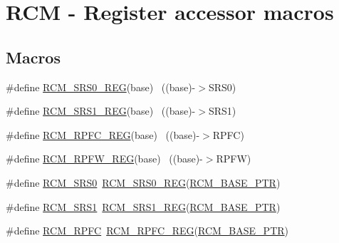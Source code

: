 \hypertarget{group___r_c_m___register___accessor___macros}{}\section{R\+CM -\/ Register accessor macros}
\label{group___r_c_m___register___accessor___macros}
\subsection*{Macros}
\begin{DoxyCompactItemize}
\item 
\#define \hyperlink{group___r_c_m___register___accessor___macros_ga9a66988adfb5c993ce955b8ca7ddaa27}{R\+C\+M\+\_\+\+S\+R\+S0\+\_\+\+R\+EG}(base)                                          ~((base)-\/$>$S\+R\+S0)
\item 
\#define \hyperlink{group___r_c_m___register___accessor___macros_gac6b0aff57a904ff809da2670a9b1992a}{R\+C\+M\+\_\+\+S\+R\+S1\+\_\+\+R\+EG}(base)                                          ~((base)-\/$>$S\+R\+S1)
\item 
\#define \hyperlink{group___r_c_m___register___accessor___macros_gaa5beb3c127ae8e82881dbd558ddf4ffb}{R\+C\+M\+\_\+\+R\+P\+F\+C\+\_\+\+R\+EG}(base)                                          ~((base)-\/$>$R\+P\+FC)
\item 
\#define \hyperlink{group___r_c_m___register___accessor___macros_ga5dd502e0c3bac4f307fbb65d51bcf2c7}{R\+C\+M\+\_\+\+R\+P\+F\+W\+\_\+\+R\+EG}(base)                                          ~((base)-\/$>$R\+P\+FW)
\item 
\#define \hyperlink{group___r_c_m___register___accessor___macros_gaae0200bfd0eb1d7f7fd0d142c21fe92a}{R\+C\+M\+\_\+\+S\+R\+S0}~\hyperlink{group___r_c_m___register___accessor___macros_ga9a66988adfb5c993ce955b8ca7ddaa27}{R\+C\+M\+\_\+\+S\+R\+S0\+\_\+\+R\+EG}(\hyperlink{group___r_c_m___peripheral_ga25ab3aa8d593d455ed36a52c77f88234}{R\+C\+M\+\_\+\+B\+A\+S\+E\+\_\+\+P\+TR})
\item 
\#define \hyperlink{group___r_c_m___register___accessor___macros_gaa2e190bc843511a82e9ec826029fbaaa}{R\+C\+M\+\_\+\+S\+R\+S1}~\hyperlink{group___r_c_m___register___accessor___macros_gac6b0aff57a904ff809da2670a9b1992a}{R\+C\+M\+\_\+\+S\+R\+S1\+\_\+\+R\+EG}(\hyperlink{group___r_c_m___peripheral_ga25ab3aa8d593d455ed36a52c77f88234}{R\+C\+M\+\_\+\+B\+A\+S\+E\+\_\+\+P\+TR})
\item 
\#define \hyperlink{group___r_c_m___register___accessor___macros_ga1c19f66051e218d534efc33ec09cc461}{R\+C\+M\+\_\+\+R\+P\+FC}~\hyperlink{group___r_c_m___register___accessor___macros_gaa5beb3c127ae8e82881dbd558ddf4ffb}{R\+C\+M\+\_\+\+R\+P\+F\+C\+\_\+\+R\+EG}(\hyperlink{group___r_c_m___peripheral_ga25ab3aa8d593d455ed36a52c77f88234}{R\+C\+M\+\_\+\+B\+A\+S\+E\+\_\+\+P\+TR})

\end{DoxyCompactItemize}
